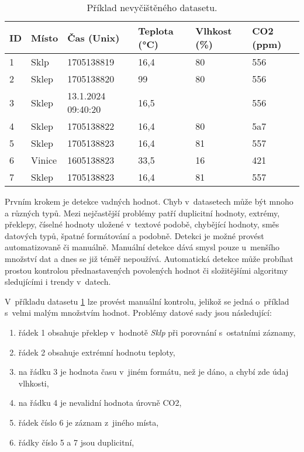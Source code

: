 \begin{table}[ht]
\begin{center}
\begin{tabular}{|l|l|l|l|l|l|}
\hline
\textbf{ID} & \textbf{Místo}  & \textbf{Čas (Unix)}        & \textbf{Teplota (°C)} & \textbf{Vlhkost} (\%) & \textbf{CO2 (ppm)} \\ \hline
1  & Sklp   & 1705138819         & 16,4         & 80          & 556       \\ \hline
2  & Sklep  & 1705138820         & 99           & 80          & 556       \\ \hline
3  & Sklep  & 13.1.2024 09:40:20 & 16,5         &             & 556       \\ \hline
4  & Sklep  & 1705138822         & 16,4         & 80          & 5a7       \\ \hline
5  & Sklep  & 1705138823         & 16,4         & 81          & 557       \\ \hline
6  & Vinice & 1605138823         & 33,5         & 16          & 421       \\ \hline
7  & Sklep  & 1705138823         & 16,4         & 81          & 557       \\ \hline
\end{tabular} \caption{Příklad nevyčištěného datasetu.} \label{table:data_cleaning} 
\end{center}
\end{table}
Prvním krokem je detekce vadných hodnot. Chyb v~datasetech může být mnoho a různých typů. Mezi nejčastější problémy patří duplicitní hodnoty, extrémy, překlepy, číselné hodnoty uložené v~textové podobě, chybějící hodnoty, směs datových typů, špatné formátování a podobně. Detekci je možné provést automatizovaně či manuálně. Manuální detekce dává smysl pouze u~menšího množství dat a dnes se již téměř nepoužívá. Automatická detekce může probíhat prostou kontrolou přednastavených povolených hodnot či složitějšími algoritmy sledujícími i trendy v~datech. 

V~příkladu datasetu \ref{table:data_cleaning} lze provést manuální kontrolu, jelikož se jedná o~příklad s~velmi malým množstvím hodnot. Problémy datové sady jsou následující:
\begin{enumerate}
    \item řádek 1 obsahuje překlep v~hodnotě \textit{Sklp} při porovnání s~ostatními záznamy,
    \item řádek 2 obsahuje extrémní hodnotu teploty,
    \item na řádku 3 je hodnota času v~jiném formátu, než je dáno, a chybí zde údaj vlhkosti,
    \item na řádku 4 je nevalidní hodnota úrovně CO2,
    \item řádek číslo 6 je záznam z~jiného místa,
    \item řádky číslo 5 a 7 jsou duplicitní,
\end{enumerate}


